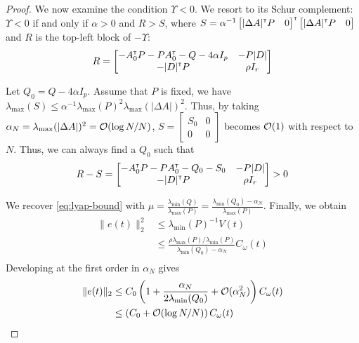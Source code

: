 \documentclass{article}
\begin{document}
\begin{proof}
We now examine the condition $\Upsilon < 0$.
We resort to its Schur complement: $\Upsilon < 0$ if and only if $\alpha > 0$ and $R > S$, where $S= \alpha^{-1}\begin{bmatrix}|\Delta A|^{\mathsf{\scriptscriptstyle T}} P & 0\end{bmatrix}^{\mathsf{\scriptscriptstyle T}} \begin{bmatrix}|\Delta A|^{\mathsf{\scriptscriptstyle T}} P & 0\end{bmatrix}$ and $R$ is the top-left block of $-\Upsilon$:
\[R = \begin{bmatrix}
-A_0^{\mathsf{\scriptscriptstyle T}} P - P A_0^{\mathsf{\scriptscriptstyle T}} - Q - 4\alpha I_p & -P|D|\\
-|D|^{\mathsf{\scriptscriptstyle T}} P & \rho I_r\\
\end{bmatrix}\]

Let $Q_0 = Q-4\alpha I_p$.
Assume that $P$ is fixed, we have $\lambda_{\max}(S) \leq \alpha^{-1}\lambda_{\max}(P)^2\lambda_{\max}(|\Delta A|)^2$.
Thus, by taking $\alpha_N = \lambda_{\max}(|\Delta A|)^2 = \mathcal{O}(\log N / N)$, $S = \begin{bmatrix}
S_0 & 0\\0 & 0
\end{bmatrix}$ becomes $\mathcal{O}(1)$ with respect to $N$.
Thus, we can always find a $Q_0$ such that
\[R-S = \begin{bmatrix}
-A_0^{\mathsf{\scriptscriptstyle T}} P - P A_0^{\mathsf{\scriptscriptstyle T}} - Q_0 - S_0 & -P|D|\\
-|D|^{\mathsf{\scriptscriptstyle T}} P & \rho I_r\\
\end{bmatrix} > 0 \]

We recover \eqref{eq:lyap-bound} with $\mu = \frac{\lambda_{\min}(Q)}{\lambda_{\max}(P)} = \frac{\lambda_{\min}(Q_0) - \alpha_N}{\lambda_{\max}(P)}$.
Finally, we obtain
\begin{align*}
\|e(t)\|_2^2 &\leq \lambda_{\min}(P)^{-1} V(t)\\
& \leq \frac{\rho\lambda_{\max}(P)/\lambda_{\min}(P)}{\lambda_{\min}(Q_0) - \alpha_N} C_\omega(t)\\
\end{align*}
Developing at the first order in $\alpha_N$ gives
\begin{align*}
\|e(t)\|_2 &\leq C_0\left(1 + \frac{\alpha_N}{2\lambda_{\min}(Q_0)} + \mathcal{O}(\alpha_N^2)\right)C_\omega(t)\\
&\leq \left(C_0 + \mathcal{O}(\log N/N)\right)C_\omega(t)
\end{align*}
\end{proof}
\end{document}
